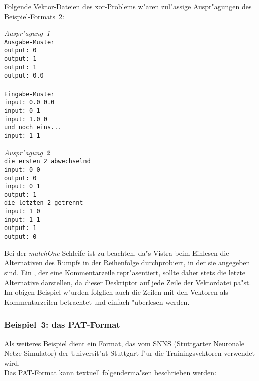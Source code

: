 Folgende Vektor-Dateien des xor-Problems w"aren zul"assige
Auspr"agungen des Bei\-spiel-Formats~2:

\nopagebreak
\parbox[t]{6cm}{
{\sl Auspr"agung~1} \\[1ex]
{\tt Ausgabe-Muster \\
output: 0 \\
output: 1 \\
output: 1 \\
output: 0.0 \\ 
\\
Eingabe-Muster \\
input: 0.0 0.0 \\
input: 0 1 \\
input: 1.0 0 \\
und noch eins... \\
input: 1 1 }} 
\parbox[t]{6cm}{{\sl Auspr"agung~2} \\[1ex] 
{\tt die ersten 2 abwechselnd \\
input:   0  0 \\
output:  0 \\
input:   0  1 \\
output:  1 \\
die letzten 2 getrennt \\
input:   1  0 \\
input:   1  1 \\
output:  1 \\
output:  0 }
}

Bei der {\it matchOne}-Schleife ist zu beachten, da"s Vistra beim
Einlesen die Alternativen des Rumpfs in der Reihenfolge durchprobiert,
in der sie angegeben sind.
Ein {\tt *}, der eine Kommentarzeile repr"asentiert, sollte daher
stets die letzte Alternative darstellen, da dieser Deskriptor auf
jede Zeile der Vektordatei pa"st.
Im obigen Beispiel w"urden folglich auch die Zeilen mit den Vektoren
als Kommentarzeilen betrachtet und einfach "uberlesen werden.

\subsubsection*{Beispiel~3: das PAT-Format}

Als weiteres Beispiel dient ein Format, das vom SNNS (Stuttgarter
Neuronale Netze Simulator) der Universit"at Stuttgart f"ur die 
Trainingsvektoren verwendet wird. \\
Das PAT-Format kann textuell folgenderma"sen beschrieben werden:

